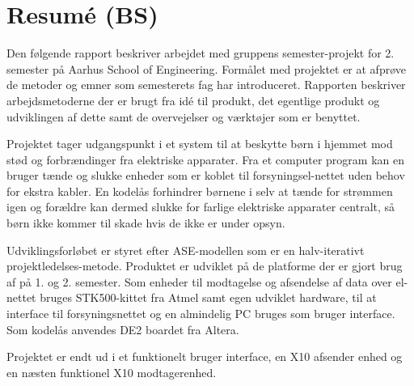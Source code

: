 \chapter*{Resumé (BS)}

Den følgende rapport beskriver arbejdet med gruppens semester-projekt for 2. semester på Aarhus School of Engineering. Formålet med projektet er at afprøve de metoder og emner som semesterets fag har introduceret. Rapporten beskriver arbejdsmetoderne der er brugt fra idé til produkt, det egentlige produkt og udviklingen af dette samt de overvejelser og værktøjer som er benyttet.

Projektet tager udgangspunkt i et system til at beskytte børn i hjemmet mod stød og forbrændinger fra elektriske apparater. Fra et computer program kan en bruger tænde og slukke enheder som er koblet til forsyningsel-nettet uden behov for ekstra kabler. En kodelås forhindrer børnene i selv at tænde for strømmen igen og forældre kan dermed slukke for farlige elektriske apparater centralt, så børn ikke kommer til skade hvis de ikke er under opsyn. 

Udviklingsforløbet er styret efter ASE-modellen som er en halv-iterativt projektledelses-metode. Produktet er udviklet på de platforme der er gjort brug af på 1. og 2. semester. Som enheder til modtagelse og afsendelse af data over el-nettet bruges STK500-kittet fra Atmel samt egen udviklet hardware, til at interface til forsyningsnettet og en almindelig PC bruges som bruger interface. Som kodelås anvendes DE2 boardet fra Altera.

Projektet er endt ud i et funktionelt bruger interface, en X10 afsender enhed og en næsten funktionel X10 modtagerenhed.